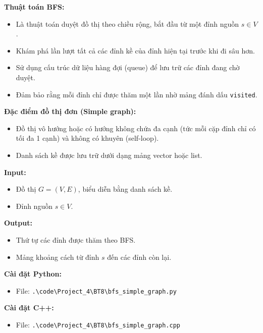 \documentclass[12pt,a4paper]{article}
\begin{document}
\textbf{Thuật toán BFS:} 

\begin{itemize}[label=\textbullet]
    \item Là thuật toán duyệt đồ thị theo chiều rộng, bắt đầu từ một đỉnh nguồn $ s \in V $.
    \item Khám phá lần lượt tất cả các đỉnh kề của đỉnh hiện tại trước khi đi sâu hơn.
    \item Sử dụng cấu trúc dữ liệu hàng đợi (queue) để lưu trữ các đỉnh đang chờ duyệt.
    \item Đảm bảo rằng mỗi đỉnh chỉ được thăm một lần nhờ mảng đánh dấu \texttt{visited}.
\end{itemize}

\textbf{Đặc điểm đồ thị đơn (Simple graph):}
\begin{itemize}[label=\textbullet]
    \item Đồ thị vô hướng hoặc có hướng không chứa đa cạnh (tức mỗi cặp đỉnh chỉ có tối đa 1 cạnh) và không có khuyên (self-loop).
    \item Danh sách kề được lưu trữ dưới dạng mảng vector hoặc list.
\end{itemize}

\textbf{Input:}
\begin{itemize}[label=\textbullet]
    \item Đồ thị $ G = (V, E) $, biểu diễn bằng danh sách kề.
    \item Đỉnh nguồn $ s \in V $.
\end{itemize}

\textbf{Output:}
\begin{itemize}[label=\textbullet]
    \item Thứ tự các đỉnh được thăm theo BFS.
    \item Mảng khoảng cách từ đỉnh $ s $ đến các đỉnh còn lại.
\end{itemize}

\textbf{Cài đặt Python:}
\begin{itemize}[label=\textbullet]
   \item File: \texttt{.\textbackslash code\textbackslash Project\_4\textbackslash BT8\textbackslash bfs\_simple\_graph.py}
\end{itemize}

\textbf{Cài đặt C++:}
\begin{itemize}[label=\textbullet]
   \item File: \texttt{.\textbackslash code\textbackslash Project\_4\textbackslash BT8\textbackslash bfs\_simple\_graph.cpp}
\end{itemize}
\end{document}
